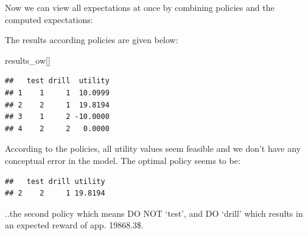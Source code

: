 \documentclass[
]{article}
\newenvironment{Shaded}{\begin{snugshade}}{\end{snugshade}}
\newcommand{\ControlFlowTok}[1]{\textcolor[rgb]{0.13,0.29,0.53}{\textbf{#1}}}
\newcommand{\DecValTok}[1]{\textcolor[rgb]{0.00,0.00,0.81}{#1}}
\newcommand{\FunctionTok}[1]{\textcolor[rgb]{0.00,0.00,0.00}{#1}}
\newcommand{\NormalTok}[1]{#1}
\newcommand{\OtherTok}[1]{\textcolor[rgb]{0.56,0.35,0.01}{#1}}
\newcommand{\SpecialCharTok}[1]{\textcolor[rgb]{0.00,0.00,0.00}{#1}}
\newcommand{\StringTok}[1]{\textcolor[rgb]{0.31,0.60,0.02}{#1}}
\begin{document}
Now we can view all expectations at once by combining policies and the computed expectations:

\begin{Shaded}
\end{Shaded}

The results according policies are given below:

\begin{Shaded}
\begin{Highlighting}[]
\NormalTok{results\_ow[]}
\end{Highlighting}
\end{Shaded}

\begin{verbatim}
##   test drill  utility
## 1    1     1  10.0999
## 2    2     1  19.8194
## 3    1     2 -10.0000
## 4    2     2   0.0000
\end{verbatim}

According to the policies, all utility values seem feasible and we don't have any conceptual error in the model.
The optimal policy seems to be:

\begin{Shaded}
\end{Shaded}

\begin{verbatim}
##   test drill utility
## 2    2     1 19.8194
\end{verbatim}

..the second policy which means DO NOT `test', and DO `drill' which results in an expected reward of app. 19868.3\$.
\end{document}
